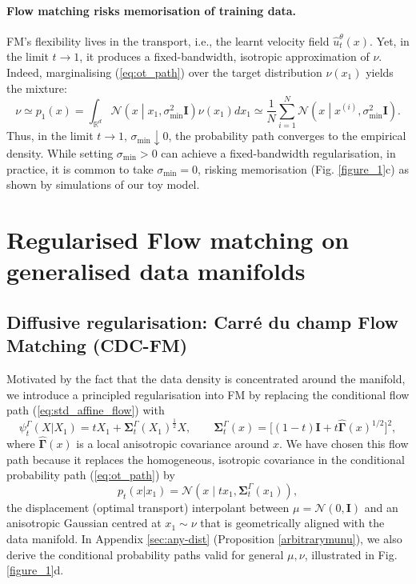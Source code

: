 \documentclass{article} %
\newcommand{\R}{\mathbb{R}}
\newcommand{\N}{\mathcal{N}}
\newcommand{\I}{\mathbf{I}}
\newcommand{\G}{\widehat{\mathbf{\Gamma}}}
\newcommand{\Si}{\mathbf{\Sigma}}
\begin{document}
\paragraph{Flow matching risks memorisation of training data.}
FM’s flexibility lives in the transport, i.e., the learnt velocity field $\hat{u}^\theta_t(x)$. 
Yet, in the limit $t\to 1$, it produces a fixed-bandwidth, isotropic approximation of $\nu$. 
Indeed, marginalising (\ref{eq:ot_path}) over the target distribution $\nu(x_1)$ yields the mixture:
%
\begin{equation}\label{eq:marginal_path}
\nu\simeq p_1(x)=\int_{\R^d} \N\left(x\middle|x_1,\sigma_{\min}^2 \I\right)\nu(x_1)dx_1\simeq \frac1N\sum_{i=1}^N \N\left(x\middle|x^{(i)},\sigma_{\min}^2 \I\right).
\end{equation}
%
Thus, in the limit $t\to1,\,\sigma_{\min}\downarrow 0$, the probability path converges to the empirical density.
While setting $\sigma_{\min}\!>\!0$ can achieve a fixed-bandwidth regularisation, in practice, it is common to take $\sigma_{\min} = 0$, risking memorisation (Fig. \ref{figure_1}c) as shown by simulations of our toy model.


\section{Regularised Flow matching on generalised data manifolds} \label{section:results}

\subsection{Diffusive regularisation: Carr\'{e} du champ Flow Matching (CDC-FM)}

Motivated by the fact that the data density is concentrated around the manifold, we introduce a principled regularisation into FM by replacing the conditional flow path (\ref{eq:std_affine_flow}) with
%
\begin{equation}\label{eq:CDC-FM_flowpath}
    \psi^\Gamma_t(X|X_1)=tX_1 + \Si_t^\Gamma(X_1)^{\frac{1}{2}}X, \qquad \Si^\Gamma_t(x) = \big[(1-t)\I + t\G(x)^{1/2}\big]^2,
\end{equation}
%
where $\G(x)$ is a local anisotropic covariance around $x$.
We have chosen this flow path because it replaces the homogeneous, isotropic covariance in the conditional probability path (\ref{eq:ot_path}) by 
%
\begin{equation}\label{eq:CDC_prob_path}
    p_t(x | x_1) = \N(x\mid tx_1,\Si_t^\Gamma(x_1)),
\end{equation}
%
the displacement (optimal transport) interpolant between $\mu=\N(0,\I)$ and an anisotropic Gaussian centred at $x_1\sim \nu$ that is geometrically aligned with the data manifold. In Appendix \ref{sec:any-dist} (Proposition \ref{arbitrarymunu}), we also derive the conditional probability paths valid for general $\mu,\nu$, illustrated in Fig. \ref{figure_1}d.
\end{document}
